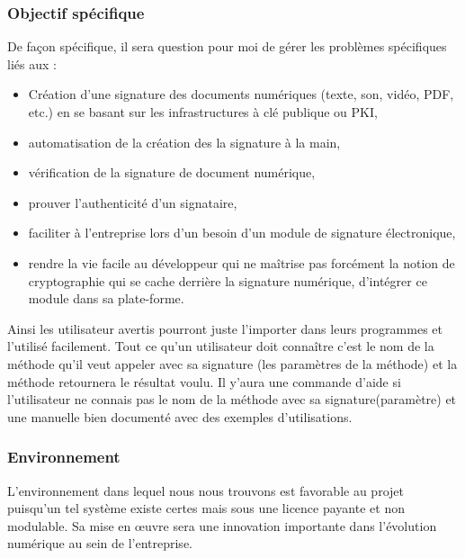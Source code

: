 \documentclass[12pt,a4paper]{article}
\begin{document}
		\subsubsection{Objectif spécifique}
			De façon spécifique, il sera question pour moi de gérer les problèmes spécifiques liés aux :
			\begin{itemize}
				\item Création d'une signature des documents numériques (texte, son, vidéo, PDF, etc.) en se basant sur les infrastructures à clé publique ou PKI,
				\item automatisation de la création des la signature à la main,
				\item vérification de la signature de document numérique,
				\item prouver l'authenticité d'un signataire,
				\item faciliter à l'entreprise lors d'un besoin d'un module de signature électronique,
			
				\item rendre la vie facile au développeur qui ne maîtrise pas forcément  la notion de cryptographie qui se cache derrière la signature numérique, d'intégrer ce module dans sa plate-forme.\\
			\end{itemize}
			Ainsi les utilisateur avertis pourront juste l'importer dans leurs programmes et l'utilisé facilement. Tout ce qu'un utilisateur doit connaître c'est le nom de la méthode qu'il veut appeler avec sa signature (les paramètres de la méthode) et la méthode retournera le résultat voulu. Il y'aura une commande d'aide si l'utilisateur ne connais pas le nom de la méthode  avec sa signature(paramètre) et une manuelle bien documenté avec des exemples d'utilisations.	
			
	
		\subsubsection*{Environnement}
		
		 
		    L’environnement dans lequel nous nous trouvons est favorable au projet puisqu’un
tel système existe certes mais sous une licence payante  et non modulable. Sa mise en œuvre sera une innovation importante dans l’évolution numérique au sein de l'entreprise.
\newpage
\end{document}
